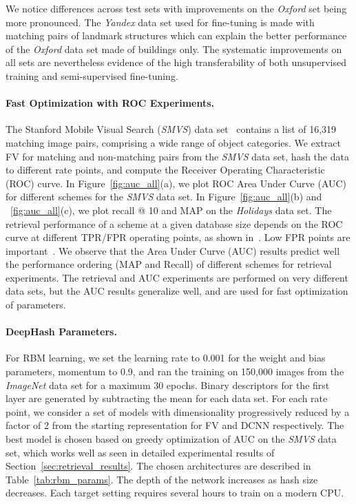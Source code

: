 \documentclass[10pt,twocolumn,letterpaper]{article}
\begin{document}
We notice differences across test sets with improvements on the {\it Oxford} set being more pronounced.
The {\it Yandex} data set used for fine-tuning is made with matching pairs of landmark structures which can explain the better performance of the {\it Oxford} data set made of buildings only.
The systematic improvements on all sets are nevertheless evidence of the high transferability of both unsupervised training and semi-supervised fine-tuning.

\vspace{-0.1em}
\paragraph{Fast Optimization with ROC Experiments.}

The Stanford Mobile Visual Search ({\it SMVS}) data set~\cite{SVMSDataSet} contains a list of 16,319 matching image pairs, comprising a wide range of object categories.
We extract FV for matching and non-matching pairs from the {\it SMVS} data set, hash the data to different rate points, and compute the Receiver Operating Characteristic (ROC) curve.
In Figure~\ref{fig:auc_all}(a), we plot ROC Area Under Curve (AUC) for different schemes for the {\it SMVS} data set. 
In Figure~\ref{fig:auc_all}(b) and ~\ref{fig:auc_all}(c), we plot recall @ 10 and MAP on the {\it Holidays} data set. 
The retrieval performance of a scheme at a given database size depends on the ROC curve at different TPR/FPR operating points, as shown in~\cite{DavidChenThesis}.
Low FPR points are important~\cite{DavidChenThesis,REVV1}.
We observe that the Area Under Curve (AUC) results predict well the performance ordering (MAP and Recall) of different schemes for retrieval experiments.
The retrieval and AUC experiments are performed on very different data sets, but the AUC results generalize well, and are used for fast optimization of parameters.

\vspace{-0.1em}
\paragraph{DeepHash Parameters.}

For RBM learning, we set the learning rate to 0.001 for the weight and bias parameters, momentum to 0.9, and ran the training on 150,000 images from the {\it ImageNet} data set for a maximum 30 epochs. 
Binary descriptors for the first layer are generated by subtracting the mean for each data set.
For each rate point, we consider a set of models with dimensionality progressively reduced by a factor of 2 from the starting representation for FV and DCNN respectively.
The best model is chosen based on greedy optimization of AUC on the {\it SMVS} data set, which works well as seen in detailed experimental results of Section~\ref{sec:retrieval_results}.
The chosen architectures are described in Table~\ref{tab:rbm_params}.
The depth of the network increases as hash size decreases.
Each target setting requires several hours to train on a modern CPU.
\end{document}
